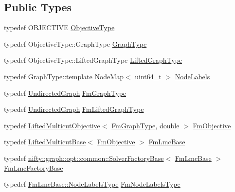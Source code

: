 \subsection*{Public Types}
\begin{DoxyCompactItemize}
\item 
typedef O\+B\+J\+E\+C\+T\+I\+VE \hyperlink{classnifty_1_1graph_1_1opt_1_1lifted__multicut_1_1FusionMove_a1d10c7f91df1a4ef65d94e27126342d7}{Objective\+Type}
\item 
typedef Objective\+Type\+::\+Graph\+Type \hyperlink{classnifty_1_1graph_1_1opt_1_1lifted__multicut_1_1FusionMove_a02154ecba736b2443ee29624a2c6e0a9}{Graph\+Type}
\item 
typedef Objective\+Type\+::\+Lifted\+Graph\+Type \hyperlink{classnifty_1_1graph_1_1opt_1_1lifted__multicut_1_1FusionMove_a4c4ef249d0dc38922d44be0803f85d59}{Lifted\+Graph\+Type}
\item 
typedef Graph\+Type\+::template Node\+Map$<$ uint64\+\_\+t $>$ \hyperlink{classnifty_1_1graph_1_1opt_1_1lifted__multicut_1_1FusionMove_adec543dc7249eea38fad43d6bedb8014}{Node\+Labels}
\item 
typedef \hyperlink{classnifty_1_1graph_1_1UndirectedGraph}{Undirected\+Graph} \hyperlink{classnifty_1_1graph_1_1opt_1_1lifted__multicut_1_1FusionMove_a234a5bccc4dc41a7c197b7db12e4898b}{Fm\+Graph\+Type}
\item 
typedef \hyperlink{classnifty_1_1graph_1_1UndirectedGraph}{Undirected\+Graph} \hyperlink{classnifty_1_1graph_1_1opt_1_1lifted__multicut_1_1FusionMove_ab9d03730657ba20ba159d69913c0cced}{Fm\+Lifted\+Graph\+Type}
\item 
typedef \hyperlink{classnifty_1_1graph_1_1opt_1_1lifted__multicut_1_1LiftedMulticutObjective}{Lifted\+Multicut\+Objective}$<$ \hyperlink{classnifty_1_1graph_1_1opt_1_1lifted__multicut_1_1FusionMove_a234a5bccc4dc41a7c197b7db12e4898b}{Fm\+Graph\+Type}, double $>$ \hyperlink{classnifty_1_1graph_1_1opt_1_1lifted__multicut_1_1FusionMove_a2832b78e4b938a4cf4fa49c79d1c9595}{Fm\+Objective}
\item 
typedef \hyperlink{classnifty_1_1graph_1_1opt_1_1lifted__multicut_1_1LiftedMulticutBase}{Lifted\+Multicut\+Base}$<$ \hyperlink{classnifty_1_1graph_1_1opt_1_1lifted__multicut_1_1FusionMove_a2832b78e4b938a4cf4fa49c79d1c9595}{Fm\+Objective} $>$ \hyperlink{classnifty_1_1graph_1_1opt_1_1lifted__multicut_1_1FusionMove_af4eb51dea4eea7b3e63b2c9a5790c5a5}{Fm\+Lmc\+Base}
\item 
typedef \hyperlink{classnifty_1_1graph_1_1opt_1_1common_1_1SolverFactoryBase}{nifty\+::graph\+::opt\+::common\+::\+Solver\+Factory\+Base}$<$ \hyperlink{classnifty_1_1graph_1_1opt_1_1lifted__multicut_1_1FusionMove_af4eb51dea4eea7b3e63b2c9a5790c5a5}{Fm\+Lmc\+Base} $>$ \hyperlink{classnifty_1_1graph_1_1opt_1_1lifted__multicut_1_1FusionMove_a94c363de011091cabdac7cc44908e63a}{Fm\+Lmc\+Factory\+Base}
\item 
typedef \hyperlink{classnifty_1_1graph_1_1opt_1_1common_1_1SolverBase_abefd51561de2fd009f6bed6bef6009ea}{Fm\+Lmc\+Base\+::\+Node\+Labels\+Type} \hyperlink{classnifty_1_1graph_1_1opt_1_1lifted__multicut_1_1FusionMove_afc62b9ce040d06e5ca24743801283baa}{Fm\+Node\+Labels\+Type}
\end{DoxyCompactItemize}
